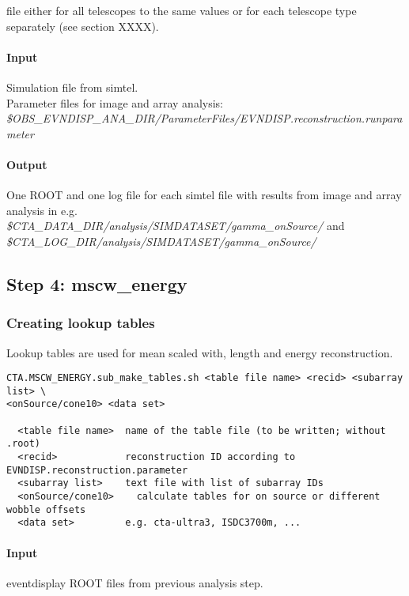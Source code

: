 \documentclass[titlepage,a4paper,twoside,11pt]{report}
\begin{document}
file either for all telescopes to the same values or for each telescope type separately
(see section XXXX). 

\paragraph{Input}
Simulation file from simtel. \\
Parameter files for image and array analysis:\\
{\it \$OBS\_EVNDISP\_ANA\_DIR/ParameterFiles/EVNDISP.reconstruction.runparameter}

\paragraph{Output}

One ROOT and one log file for each simtel file with results from image and array analysis in e.g. \\
{\it \$CTA\_DATA\_DIR/analysis/SIMDATASET/gamma\_onSource/} and \\
{\it \$CTA\_LOG\_DIR/analysis/SIMDATASET/gamma\_onSource/} 

\subsection{Step 4: mscw\_energy}

\subsubsection{Creating lookup tables}

Lookup tables are used for mean scaled with, length and energy reconstruction.

\begin{lstlisting}
CTA.MSCW_ENERGY.sub_make_tables.sh <table file name> <recid> <subarray list> \
<onSource/cone10> <data set>

  <table file name>  name of the table file (to be written; without .root)
  <recid>            reconstruction ID according to EVNDISP.reconstruction.parameter
  <subarray list>    text file with list of subarray IDs
  <onSource/cone10>    calculate tables for on source or different wobble offsets
  <data set>         e.g. cta-ultra3, ISDC3700m, ... 
\end{lstlisting}

\paragraph{Input}
eventdisplay ROOT files from previous analysis step.
\end{document}

